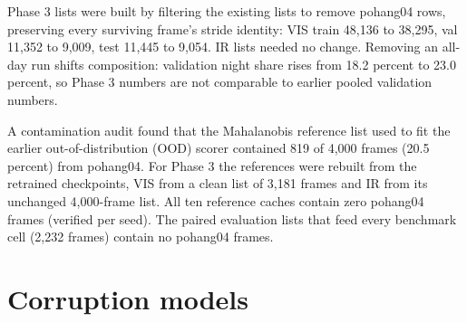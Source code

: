 \documentclass[10pt]{article}
\begin{document}
Phase 3 lists were built by filtering the existing lists to remove pohang04 rows, preserving every surviving frame's stride identity: VIS train 48,136 to 38,295, val 11,352 to 9,009, test 11,445 to 9,054. IR lists needed no change. Removing an all-day run shifts composition: validation night share rises from 18.2 percent to 23.0 percent, so Phase 3 numbers are not comparable to earlier pooled validation numbers.

A contamination audit found that the Mahalanobis reference list used to fit the earlier out-of-distribution (OOD) scorer contained 819 of 4,000 frames (20.5 percent) from pohang04. For Phase 3 the references were rebuilt from the retrained checkpoints, VIS from a clean list of 3,181 frames and IR from its unchanged 4,000-frame list. All ten reference caches contain zero pohang04 frames (verified per seed). The paired evaluation lists that feed every benchmark cell (2,232 frames) contain no pohang04 frames.

\FloatBarrier
\section{Corruption models}\label{app:B}
\end{document}
